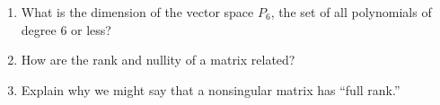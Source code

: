 \begin{enumerate}
%
\item What is the dimension of the vector space $P_6$, the set of all polynomials of degree 6 or less?
%
\item How are the rank and nullity of a matrix related?
%
\item Explain why we might say that a nonsingular matrix has ``full rank.''
%
\end{enumerate}